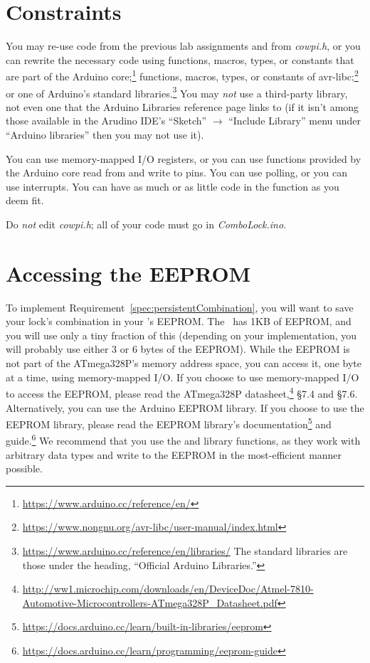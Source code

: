\section{Constraints}\label{sec:Constraints}

You may re-use code from the previous lab assignments and from \textit{cowpi.h},
or you can rewrite the necessary code using functions, macros, types, or
constants that are part of the Arduino
core;\footnote{\url{https://www.arduino.cc/reference/en/}} functions, macros,
types, or constants of
avr-libc;\footnote{\url{https://www.nongnu.org/avr-libc/user-manual/index.html}}
or one of Arduino's standard
libraries.\footnote{\url{https://www.arduino.cc/reference/en/libraries/} The
standard libraries are those under the heading, ``Official Arduino Libraries.''}
You may \textit{not} use a third-party library, not even one that the Arduino
Libraries reference page links to (if it isn't among those available in the
Arudino IDE's ``Sketch'' $\rightarrow$ ``Include Library'' menu under ``Arduino
libraries'' then you may not use it).

You can use memory-mapped I/O registers, or you can use functions provided by
the Arduino core read from and write to pins. You can use polling, or you can
use interrupts. You can have as much or as little code in the 
function as you deem fit.

Do \textit{not} edit \textit{cowpi.h}; all of your code must go in
\textit{ComboLock.ino}.

\section{Accessing the EEPROM} \label{sec:AccessingEEProm}

To implement Requirement~\ref{spec:persistentCombination}, you will want to save
your lock's combination in your \nano's EEPROM. The \nano\ has 1KB of EEPROM,
and you will use only a tiny fraction of this (depending on your implementation,
you will probably use either 3 or 6 bytes of the EEPROM). While the EEPROM is
not part of the ATmega328P's memory address space, you can access it, one byte
at a time, using memory-mapped I/O. If you choose to use memory-mapped I/O to access the EEPROM, please read the ATmega328P
datasheet,\footnote{\url{http://ww1.microchip.com/downloads/en/DeviceDoc/Atmel-7810-Automotive-Microcontrollers-ATmega328P_Datasheet.pdf}}
§7.4 and §7.6. Alternatively, you can use the Arduino EEPROM library. If you
choose to use the EEPROM library, please read the EEPROM library's
documentation\footnote{\url{https://docs.arduino.cc/learn/built-in-libraries/eeprom}}
and guide.\footnote{\url{https://docs.arduino.cc/learn/programming/eeprom-guide}}
We recommend that you use the  and
 library functions, as they work with arbitrary data
types and write to the EEPROM in the most-efficient manner possible.

